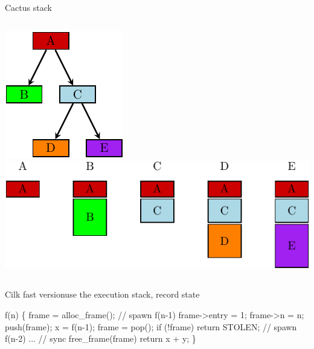 \documentclass[13pt]{beamer}
\begin{document}
\begin{frame}{Cactus stack}{}
\begin{columns}
\includegraphics[width=\textwidth]{figs/cilk-cactus-spawn}
\includegraphics[width=\textwidth]{figs/cilk-cactus-stack}
\end{columns}
\end{frame}

\begin{frame}[fragile]{Cilk fast version}{use the execution stack, record state}
\begin{semiverbatim}{\small
f(n) \{
    frame = alloc_frame();
    // spawn f(n-1)
    frame->entry = 1;
    frame->n = n;
    push(frame);
    x = f(n-1);
    frame = pop();
    if (!frame)
      return STOLEN;
    // spawn f(n-2)
    ...
    // sync
    free_frame(frame)
    return x + y;
\}
}\end{semiverbatim}
\end{frame}
\end{document}
